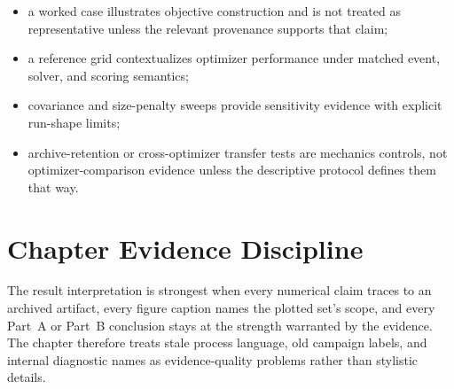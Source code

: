 \begin{itemize}[leftmargin=*]
    \item a worked case illustrates objective construction and is not treated as representative unless the relevant provenance supports that claim;
    \item a reference grid contextualizes optimizer performance under matched event, solver, and scoring semantics;
    \item covariance and size-penalty sweeps provide sensitivity evidence with explicit run-shape limits;
    \item archive-retention or cross-optimizer transfer tests are mechanics controls, not optimizer-comparison evidence unless the descriptive protocol defines them that way.
\end{itemize}

\section{Chapter Evidence Discipline} \label{se:results_evidence_discipline}

The result interpretation is strongest when every numerical claim traces to an archived artifact, every figure caption names the plotted set's scope, and every Part~A or Part~B conclusion stays at the strength warranted by the evidence. The chapter therefore treats stale process language, old campaign labels, and internal diagnostic names as evidence-quality problems rather than stylistic details.
